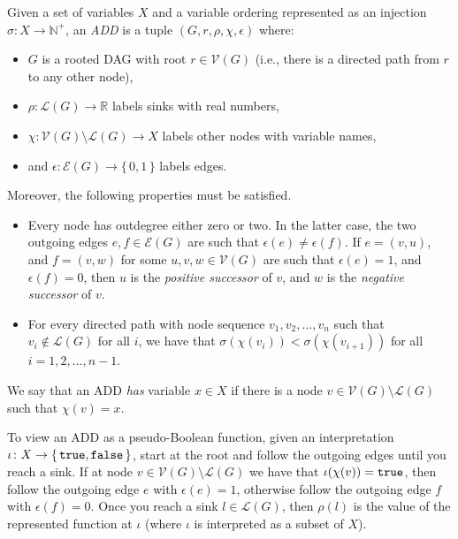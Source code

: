 \begin{definition}\label{def:add}
  Given a set of variables $X$ and a variable ordering represented as an
  injection $\sigma\colon X \to \mathbb{N}^+$, an \emph{ADD} is a tuple
  $(G, r, \rho, \chi, \epsilon)$ where:
  \begin{itemize}
    \item $G$ is a rooted DAG with root $r \in \mathcal{V}(G)$ (i.e., there is a
          directed path from $r$ to any other node),
    \item $\rho\colon \mathcal{L}(G) \to \mathbb{R}$ labels sinks with real
          numbers,
    \item $\chi\colon \mathcal{V}(G) \setminus \mathcal{L}(G) \to X$ labels
          other nodes with variable names,
    \item and $\epsilon\colon \mathcal{E}(G) \to \{\,0, 1\,\}$ labels edges.
  \end{itemize}
  Moreover, the following properties must be satisfied.
  \begin{itemize}
    \item Every node has outdegree either zero or two. In the latter case, the
          two outgoing edges $e, f \in \mathcal{E}(G)$ are such that
          $\epsilon(e) \ne \epsilon(f)$. If $e = (v, u)$, and $f = (v, w)$ for
          some $u, v, w \in \mathcal{V}(G)$ are such that $\epsilon(e) = 1$, and
          $\epsilon(f) = 0$, then $u$ is the \emph{positive successor} of $v$,
          and $w$ is the \emph{negative successor} of $v$.
    \item For every directed path with node sequence $v_1, v_2, \dots, v_n$ such
          that $v_i \not\in \mathcal{L}(G)$ for all $i$, we have that
          $\sigma(\chi(v_i)) < \sigma(\chi(v_{i+1}))$ for all
          $i = 1, 2, \dots, n - 1$.
  \end{itemize}
  We say that an ADD \emph{has} variable $x \in X$ if there is a node
  $v \in \mathcal{V}(G) \setminus \mathcal{L}(G)$ such that $\chi(v) = x$.
\end{definition}

To view an ADD as a pseudo-Boolean function, given an interpretation
$\iota\colon X \to \{\, \texttt{true}{}, \texttt{false}{} \,\}$, start at the root and follow
the outgoing edges until you reach a sink. If at node
$v \in \mathcal{V}(G) \setminus \mathcal{L}(G)$ we have that
$\iota(\chi(v)) = \texttt{true}{}$, then follow the outgoing edge $e$ with
$\epsilon(e) = 1$, otherwise follow the outgoing edge $f$ with
$\epsilon(f) = 0$. Once you reach a sink $l \in \mathcal{L}(G)$, then $\rho(l)$
is the value of the represented function at $\iota$ (where $\iota$ is
interpreted as a subset of $X$).

